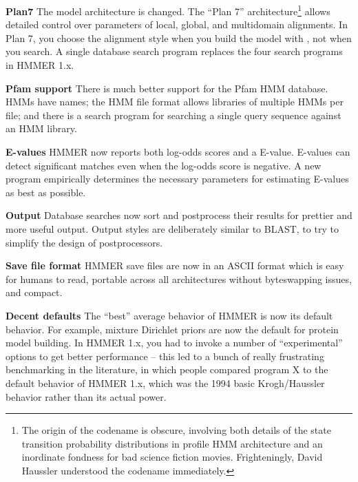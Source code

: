\begin{wideitem}

\item [\textbf{Plan7}] The model architecture is changed. The ``Plan 7''
architecture\footnote{The origin of the codename is obscure, involving
both details of the state transition probability distributions in
profile HMM architecture and an inordinate fondness for bad science
fiction movies. Frighteningly, David Haussler understood the codename
immediately.} allows detailed control over parameters of local,
global, and multidomain alignments. In Plan 7, you choose the
alignment style when you build the model with , not
when you search. A single database search program 
replaces the four search programs in HMMER 1.x.

\item [\textbf{Pfam support}] There is much better support for the Pfam
HMM database. HMMs have names; the HMM file format allows libraries of
multiple HMMs per file; and there is a search program
for searching a single query sequence against an HMM library.

\item [\textbf{E-values}] HMMER now reports both log-odds scores and
a E-value. E-values can detect significant matches even when the
log-odds score is negative. A new program 
empirically determines the necessary parameters for estimating
E-values as best as possible.

\item [\textbf{Output}] Database searches now sort and postprocess their results for
prettier and more useful output. Output styles are deliberately
similar to BLAST, to try to simplify the design of postprocessors.

\item [\textbf{Save file format}] HMMER save files are now in an ASCII format which
  is easy for humans to read, portable across all architectures
  without byteswapping issues, and compact.

\item [\textbf{Decent defaults}] The ``best'' average behavior of HMMER is now its
default behavior. For example, mixture Dirichlet priors are now the
default for protein model building. In HMMER 1.x, you had to invoke a
number of ``experimental'' options to get better performance -- this
led to a bunch of really frustrating benchmarking in the literature,
in which people compared program X to the default behavior of HMMER
1.x, which was the 1994 basic Krogh/Haussler behavior rather than its
actual power.

\end{wideitem}

